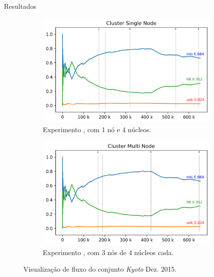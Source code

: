 \documentclass[aspectratio=1610,10pt]{beamer}
\begin{document}
\begin{frame}[fragile]{Resultados}
  \begin{figure}
    \begin{subfigure}{0.49\textwidth}
      \includegraphics[width=1\linewidth]{experiments/tmi-base-log.png}
      \caption{Experimento \expC, \mfog com 1 nó e 4 núcleos.}
      \label{fig:single-flow}
    \end{subfigure}
    \hfill
    \begin{subfigure}{0.49\textwidth}
      \includegraphics[width=1\linewidth]{experiments/tmi-n12-log.png}
      \caption{Experimento \expD, \mfog com 3 nós de 4 núcleos cada.}
      \label{fig:multi-flow}
    \end{subfigure}
    \caption{Visualização de fluxo do conjunto \emph{Kyoto} Dez. 2015.}
  \end{figure}
\end{frame}
\end{document}

